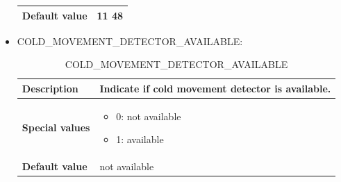 \documentclass{template/openetcs}
\begin{document}
\begin{itemize}
\begin{longtable}{|l|l|}
				\hline
				
					\begin{minipage}[t]{0.22\linewidth} \textbf{Default value}	\end{minipage} 
				&	\begin{minipage}[t]{0.78\linewidth} 11 48 \end{minipage} \\
				
				\hline
				
			\end{longtable}

		\item COLD\_MOVEMENT\_DETECTOR\_AVAILABLE:
											
			\begin{longtable}{|l|l|}
				\caption{COLD\_MOVEMENT\_DETECTOR\_AVAILABLE}\\ 
				\hline
				
					\begin{minipage}[t]{0.22\linewidth} \textbf{Description}	\end{minipage} 
				&	\begin{minipage}[t]{0.78\linewidth} Indicate if cold movement detector is available. \end{minipage} \\
				
				\hline
																																									
					\begin{minipage}[t]{0.22\linewidth} \textbf{Special values}	\end{minipage} 
				&	\begin{minipage}[t]{0.78\linewidth} \begin{itemize} \item 0: not available \item 1: available \end{itemize} \end{minipage} \\
				
				\hline
				
					\begin{minipage}[t]{0.22\linewidth} \textbf{Default value}	\end{minipage} 
				&	\begin{minipage}[t]{0.78\linewidth} not available \end{minipage} \\
				
				\hline
				
			\end{longtable}
														
	\end{itemize}
\end{document}
